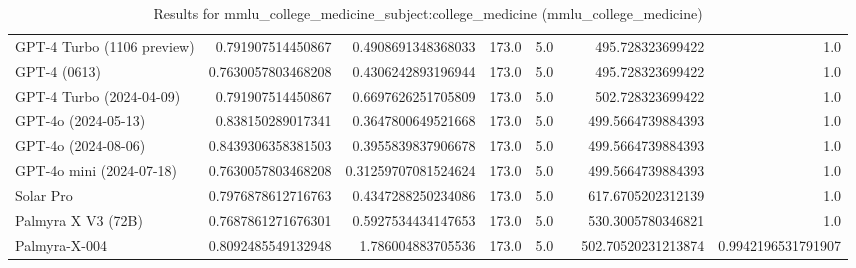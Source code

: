 \begin{table}[htp]
{\begin{tabular}{lrrrrrrr}
GPT-4 Turbo (1106 preview) & 0.791907514450867 & 0.4908691348368033 & 173.0 & 5.0 &  & 495.728323699422 & 1.0 \\
GPT-4 (0613) & 0.7630057803468208 & 0.4306242893196944 & 173.0 & 5.0 &  & 495.728323699422 & 1.0 \\
GPT-4 Turbo (2024-04-09) & 0.791907514450867 & 0.6697626251705809 & 173.0 & 5.0 &  & 502.728323699422 & 1.0 \\
GPT-4o (2024-05-13) & 0.838150289017341 & 0.3647800649521668 & 173.0 & 5.0 &  & 499.5664739884393 & 1.0 \\
GPT-4o (2024-08-06) & 0.8439306358381503 & 0.3955839837906678 & 173.0 & 5.0 &  & 499.5664739884393 & 1.0 \\
GPT-4o mini (2024-07-18) & 0.7630057803468208 & 0.31259707081524624 & 173.0 & 5.0 &  & 499.5664739884393 & 1.0 \\
Solar Pro & 0.7976878612716763 & 0.4347288250234086 & 173.0 & 5.0 &  & 617.6705202312139 & 1.0 \\
Palmyra X V3 (72B) & 0.7687861271676301 & 0.5927534434147653 & 173.0 & 5.0 &  & 530.3005780346821 & 1.0 \\
Palmyra-X-004 & 0.8092485549132948 & 1.786004883705536 & 173.0 & 5.0 &  & 502.70520231213874 & 0.9942196531791907 \\
\bottomrule
\end{tabular}}
\caption{Results for mmlu_college_medicine_subject:college_medicine (mmlu_college_medicine)}
\label{fig:mmlu_college_medicine_subject:college_medicine (mmlu_college_medicine)}
\end{table}